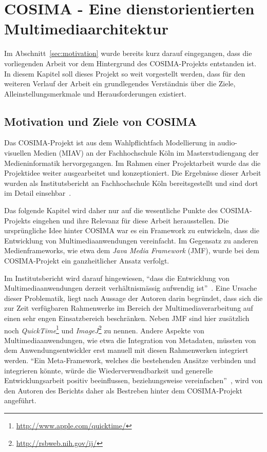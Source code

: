
\chapter{COSIMA - Eine dienstorientierten Multimediaarchitektur} %
\label{cha:eine_dienstorientierten_multimediaarchitektur}

  Im Abschnitt~\ref{sec:motivation} wurde bereits kurz darauf eingegangen, dass die vorliegenden Arbeit vor dem Hintergrund des COSIMA-Projekts entstanden ist. In diesem Kapitel soll dieses Projekt so weit vorgestellt werden, dass für den weiteren Verlauf der Arbeit ein grundlegendes Verständnis über die Ziele, Alleinstellungsmerkmale und Herausforderungen existiert.
  
\section{Motivation und Ziele von COSIMA} %
\label{sec:motivation_und_ziele_von_cosima}

  Das COSIMA-Projekt ist aus dem Wahlpflichtfach Modellierung in audio-visuellen Medien (MIAV) an der Fachhochschule Köln im Masterstudiengang der Medieninformatik hervorgegangen. Im Rahmen einer Projektarbeit wurde das die Projektidee weiter ausgearbeitet und konzeptioniert. Die Ergebnisse dieser Arbeit wurden als Institutsbericht an Fachhochschule Köln bereitsgestellt und sind dort im Detail einsehbar~\citep{bericht}.
  
  Das folgende Kapitel wird daher nur auf die wesentliche Punkte des COSIMA-Projekts eingehen und ihre Relevanz für diese Arbeit herausstellen. Die ursprüngliche Idee hinter COSIMA war es ein Framework zu entwickeln, dass die Entwicklung von Multimediaanwendungen vereinfacht. Im Gegensatz zu anderen Medienframeworks, wie etwa dem \emph{Java Media Framework} (JMF), wurde bei dem COSIMA-Projekt ein ganzheitlicher Ansatz verfolgt.
  
  Im Institutsbericht wird darauf hingewiesen, "`dass die Entwicklung von Multimediaanwendungen derzeit verhältnismässig aufwendig ist"'~\citep[S. 2]{bericht}. Eine Ursache dieser Problematik, liegt nach Aussage der Autoren darin begründet, dass sich die zur Zeit verfügbaren Rahmenwerke im Bereich der Multimediaverarbeitung auf einen sehr engen Einsatzbereich beschränken. Neben JMF sind hier zusätzlich noch \emph{QuickTime}\footnote{\url{http://www.apple.com/quicktime/}} und \emph{ImageJ}\footnote{\url{http://rsbweb.nih.gov/ij/}} zu nennen. Andere Aspekte von Multimediaanwendungen, wie etwa die Integration von Metadaten, müssten von dem Anwendungsentwickler erst manuell mit diesen Rahmenwerken integriert werden. "`Ein Meta-Framework, welches die bestehenden Ansätze verbinden und integrieren könnte, würde die Wiederverwendbarkeit und generelle Entwicklungsarbeit positiv beeinflussen, beziehungsweise vereinfachen"'~\citep[S. 3]{bericht}, wird von den Autoren des Berichts daher als Bestreben hinter dem COSIMA-Projekt angeführt.
  
